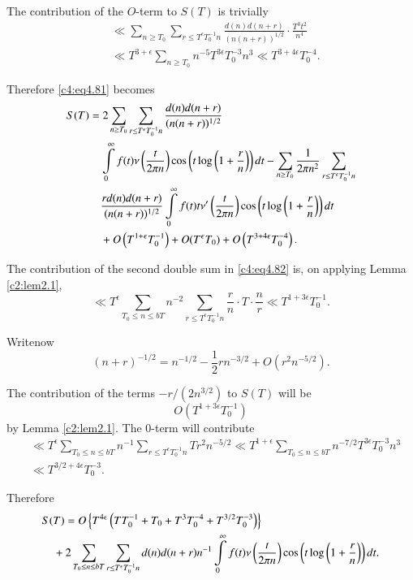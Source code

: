 The contribution of the $O$-term to $S(T)$ is trivially 
\begin{align*}
  & \ll \sum_{n \geq T_0} \sum_{r \leq T^\epsilon T^{-1}_0n}
  \frac{d(n) d(n+r)}{(n (n+r))^{1/2}} \cdot \frac{T^3t^2}{n^4}\\[5pt]
    & \ll T^{3+\epsilon} \sum_{n \geq T_0} n^{-5} T^{3 \epsilon}
    T^{-3}_0 n^3 \ll T^{3+ 4 \epsilon} T_0^{-4}. 
\end{align*}

Therefore \eqref{c4:eq4.81} becomes
\begin{align}
  S(T) & = 2 \sum_{n \geq T_0} \sum_{r \leq T^\epsilon T_0^{-1}n}
  \frac{d(n) d(n+r)}{(n (n+r))^{1/2}}\label{c4:eq4.82}\\
  &\quad \int\limits_0^\infty f(t) \nu \left(\frac{t}{2 \pi n} \right) \cos
  \left(t \log \left(1 + \frac{r}{n} \right) \right)dt-\sum_{n \geq
    T_0} \frac{1}{2 \pi n^2} \sum_{r \leq T^\epsilon T^{-1}_0 n}\notag\\
  &\quad \frac{rd(n) d(n+r)}{(n(n+r))^{1/2}} \int\limits_0^\infty f(t) t
   \nu' \left(\frac{t}{2 \pi n} \right) 
   \cos \left(t \log\left(1+ \frac{r}{n} \right) \right)dt \notag\\
   &\quad + O\left(T^{1+\epsilon} T^{-1}_0\right) + O(T^\epsilon T_0)
   + O\left(T^{3+ 4 \epsilon} T^{-4}_0\right).\notag
\end{align}

The contribution of the second double sum in \eqref{c4:eq4.82} is, on
applying Lemma \ref{c2:lem2.1},
$$
\ll T^\epsilon \sum_{T_0 \leq n \leq bT} n^{-2} \sum_{r \leq
  T^\epsilon T^{-1}_0 n} \frac{r}{n} \cdot T \cdot \frac{n}{r} \ll
T^{1+3 \epsilon} T^{-1}_0.
$$

Write\pageoriginale now 
$$
(n+r)^{-1/2}= n^{-1/2} - \frac{1}{2} rn^{-3/2} + O\left(r^2 n^{-5/2}\right).  
$$

The contribution of the terms $-r /(2n^{3/2})$ to $S(T)$ will be 
$$
O\left(T^{1+3\epsilon} T_0^{-1}\right)
$$ 
by Lemma \ref{c2:lem2.1}. The 0-term will contribute
\begin{align*}
&  \ll T^\epsilon \sum_{T_0 \leq n \leq  bT}n^{-1} \sum_{r \leq T^\epsilon
  T_0^{-1}n} Tr^2 n^{-5/2} \ll T^{1+\epsilon} \sum_{T_0 \leq n \leq
  bT} n^{-7/2} T^{3 \epsilon}T^{-3}_0 n^3\\[5pt]
&  \ll T^{3/2 + 4 \epsilon} T^{-3}_0.
\end{align*}

Therefore
{\fontsize{10}{12}\selectfont
\begin{align}
&  S(T)  = O\left\{T^{4 \epsilon} \left(TT_0^{-1} + T_0 + T^3 T^{-4}_0 +
  T^{3/2} T_0^{-3}\right) \right\}\label{c4:eq4.83}\\
&\quad  + 2 \sum_{T_0 \leq n \leq bT} \sum_{r \leq T^\epsilon T^{-1}_0n}
  d(n) d(n+r)n^{-1} \int\limits_0^\infty f(t) \nu \left(\frac{t}{2 \pi
    n}\right) \cos \left(t \log \left(1+ \frac{r}{n}\right) \right) dt.\notag
\end{align}}

